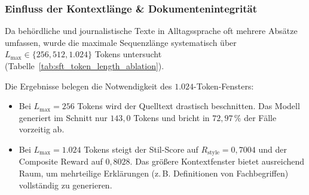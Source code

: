 \subsubsection{Einfluss der Kontextlänge \& Dokumentenintegrität}
\label{sec:sft_token_length_ablation}

Da behördliche und journalistische Texte in Alltagssprache oft mehrere Absätze umfassen, wurde die maximale Sequenzlänge systematisch über $L_{\max} \in \{256, 512, 1.024\}$ Tokens untersucht (Tabelle~\ref{tab:sft_token_length_ablation}).

\begin{table}[htbp]
\centering
\small
\caption[Einfluss der Token-Kontextlänge auf die SFT-Generierungsqualität]{Einfluss der maximalen Token-Kontextlänge ($L_{\max}$ in Byte-Pair-Encoding-Tokens) auf die Generierungsqualität des überwachten Feintunings (Supervised Fine-Tuning, SFT) auf dem Lebenshilfe-Goldstandard ($N=37$ Artikelpaare) unter Angabe von Stil- ($R_{\text{style}}$), Semantik-Score ($R_{\text{sem, AS}}$ via Jina-v2), Composite Reward sowie der Satzabbruchquote (Truncation).}
\label{tab:sft_token_length_ablation}
\end{table}

Die Ergebnisse belegen die Notwendigkeit des $1.024$-Token-Fensters:
\begin{itemize}
    \item Bei $L_{\max} = 256$ Tokens wird der Quelltext drastisch beschnitten. Das Modell generiert im Schnitt nur $143{,}0$ Tokens und bricht in $72{,}97\,\%$ der Fälle vorzeitig ab.
    \item Bei $L_{\max} = 1.024$ Tokens steigt der Stil-Score auf $R_{\text{style}} = 0{,}7004$ und der Composite Reward auf $0{,}8028$. Das größere Kontextfenster bietet ausreichend Raum, um mehrteilige Erklärungen (z.\,B. Definitionen von Fachbegriffen) vollständig zu generieren.
\end{itemize}

